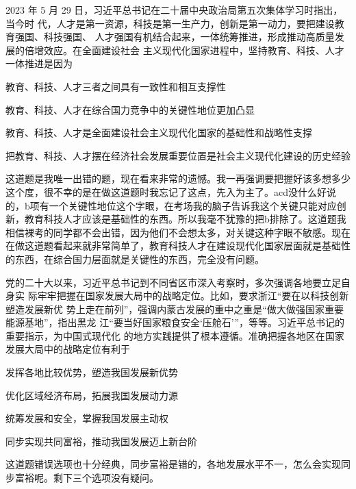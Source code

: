 \documentclass[lang=cn,blue,10pt,scheme=chinese,twocol]{zznote}
\begin{document}
\begin{exercise}2023 年 5 月 29 日，习近平总书记在二十届中央政治局第五次集体学习时指出，当今时 代，人才是第一资源，科技是第一生产力，创新是第一动力，要把建设教育强国、科技强国、 人才强国有机结合起来，一体统筹推进，形成推动高质量发展的倍增效应。在全面建设社会 主义现代化国家进程中，坚持教育、科技、人才一体推进是因为
	\begin{choice}
		\item 教育、科技、人才三者之间具有一致性和相互支撑性
		\item 教育、科技、人才在综合国力竞争中的关键性地位更加凸显
		\item 教育、科技、人才是全面建设社会主义现代化国家的基础性和战略性支撑
		\item 把教育、科技、人才摆在经济社会发展重要位置是社会主义现代化建设的历史经验
	\end{choice}
\end{exercise}
\begin{solution}
	这道题是我唯一出错的题，现在看来非常的遗憾。我一再强调要把握好该多想多少这个度，很不幸的是在做这道题时我忘记了这点，先入为主了。acd没什么好说的，b项有一个关键性地位这个字眼，在考场我的脑子告诉我这个关键只能对应创新，教育科技人才应该是基础性的东西。所以我毫不犹豫的把b排除了。这道题我相信裸考的同学都不会出错，因为他们不会想太多，对关键这种字眼不敏感。现在在做这道题看起来就非常简单了，教育科技人才在建设现代化国家层面就是基础性的东西，在综合国力层面就是关键性的东西，完全没有问题。
\end{solution}


\begin{exercise}党的二十大以来，习近平总书记到不同省区市深入考察时，多次强调各地要立足自身实 际牢牢把握在国家发展大局中的战略定位。比如，要求浙江“要在以科技创新塑造发展新优 势上走在前列”，强调内蒙古发展的重中之重是“做大做强国家重要能源基地”，指出黑龙 江“要当好国家粮食安全‘压舱石’”，等等。习近平总书记的重要指示，为中国式现代化 的地方实践提供了根本遵循。准确把握各地区在国家发展大局中的战略定位有利于
	\begin{choice}
		\item 发挥各地比较优势，塑造我国发展新优势
		\item 优化区域经济布局，拓展我国发展动力源
		\item 统筹发展和安全，掌握我国发展主动权
		\item 同步实现共同富裕，推动我国发展迈上新台阶
	\end{choice}
\end{exercise}
\begin{solution}
	这道题错误选项也十分经典，同步富裕是错的，各地发展水平不一，怎么会实现同步富裕呢。剩下三个选项没有疑问。
\end{solution}
\end{document}
